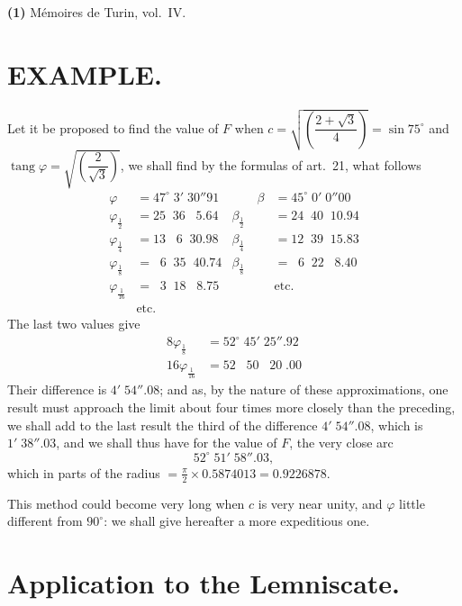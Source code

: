 \documentclass{article}
\begin{document}
\textbf{(1)} Mémoires de Turin, vol.\ IV.

\section*{EXAMPLE.}

Let it be proposed to find the value of $F$ when $c=\sqrt{\left(\dfrac{2+\sqrt{3}}{4}\right)}=\sin 75^{\circ}$ and $\operatorname{tang}\varphi=\sqrt{\left(\dfrac{2}{\sqrt{3}}\right)}$, we shall find by the formulas of art.\ 21, what follows
\[ \begin{aligned} \varphi &= 47^{\circ}\;3'\;30''91 & \qquad \beta &= 45^{\circ}\;0'\;0''00 \\ \varphi_{\frac{1}{2}} &= 25\;\;36\;\;\;5.64 & \beta_{\frac{1}{2}} &= 24\;\;40\;\;10.94 \\ \varphi_{\frac{1}{4}} &= 13\;\;\;6\;\;30.98 & \beta_{\frac{1}{4}} &= 12\;\;39\;\;15.83 \\ \varphi_{\frac{1}{8}} &= \;\;6\;\;35\;\;40.74 & \beta_{\frac{1}{8}} &= \;\;6\;\;22\;\;\;8.40 \\ \varphi_{\frac{1}{16}} &= \;\;3\;\;18\;\;\;8.75 & &\text{etc.} \\ &\text{etc.} & & \end{aligned} \]
The last two values give
\[ \begin{aligned} 8\varphi_{\frac{1}{8}} &= 52^{\circ}\;45'\;25''.92 \\ 16\varphi_{\frac{1}{16}} &= 52\;\;\;50\;\;\;20\;.00 \end{aligned} \]
Their difference is $4'\;54''.08$; and as, by the nature of these approximations, one result must approach the limit about four times more closely than the preceding, we shall add to the last result the third of the difference $4'\;54''.08$, which is $1'\;38''.03$, and we shall thus have for the value of $F$, the very close arc
\[ 52^{\circ}\;51'\;58''.03, \]
which in parts of the radius $=\frac{\pi}{2}\times 0.5874013=0.9226878$.

This method could become very long when $c$ is very near unity, and $\varphi$ little different from $90^{\circ}$: we shall give hereafter a more expeditious one.

\section*{Application to the Lemniscate.}
\end{document}
